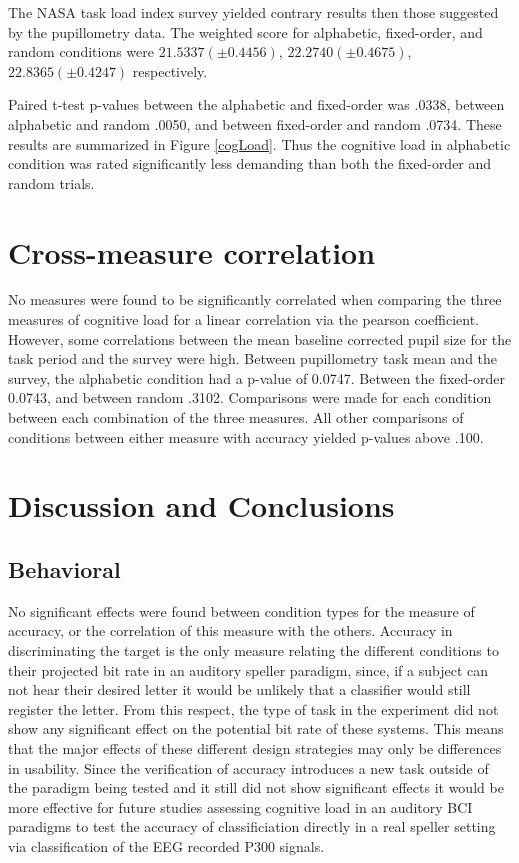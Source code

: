 \documentclass[10pt]{article}
\begin{document}
The NASA task load index survey yielded contrary results then
those suggested by the pupillometry data.  
The weighted score for alphabetic, fixed-order, and random
conditions were 
$21.5337 (\pm 0.4456)$, $22.2740 (\pm 0.4675)$, $22.8365 (\pm
0.4247)$ respectively.

Paired t-test p-values between the alphabetic and fixed-order was
.0338, between alphabetic and random .0050, and between fixed-order
and random .0734.  These results are summarized in Figure
\ref{cogLoad}.  Thus the cognitive load in alphabetic condition was
rated significantly less demanding than both the fixed-order and
random trials.

\section{ Cross-measure correlation}
No measures were found to
be significantly correlated when comparing the three measures of cognitive load for a linear correlation via the pearson coefficient. However, some correlations between the
mean baseline corrected pupil size for the task period and the survey were high.
Between pupillometry task mean and the survey, the alphabetic condition had a p-value
of 0.0747.  Between the fixed-order 0.0743, and between random
.3102.
Comparisons were made for each condition
between each combination of the three measures.  All other
comparisons of conditions between either measure with accuracy yielded
p-values above .100.

\section{Discussion and Conclusions}

\subsection{Behavioral}

No significant effects were found between condition types for
the measure of accuracy, or the correlation of this measure
with the others.  Accuracy in discriminating the target is the
only measure relating the different conditions to their
projected bit rate in an auditory speller paradigm, since, if
a subject can not hear their desired letter it would be
unlikely that a classifier would still register the letter.
From this respect, the type of task in the experiment did not
show any significant effect on the potential bit rate of these
systems. This means that the major effects of these different
design strategies may only be differences in usability. Since
the verification of accuracy introduces a new task outside of
the paradigm being tested and it still did not show
significant effects it would be more effective for future
studies assessing cognitive load in an auditory BCI paradigms
to test the accuracy of classificiation directly in a real
speller setting via classification of the EEG recorded P300
signals.
\end{document}
